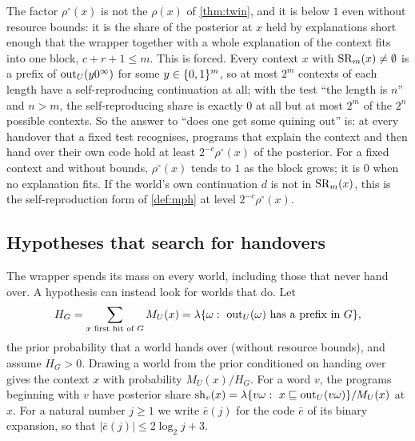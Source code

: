 The factor $\rho^\circ(x)$ is not the $\rho(x)$ of \cref{thm:twin}, and it is below $1$ even without resource
bounds: it is the share of the posterior at $x$ held by explanations short enough that the wrapper together
with a whole explanation of the context fits into one block, $c+r+1\le m$. This is forced. Every context $x$
with $\mathrm{SR}_m(x)\neq\emptyset$ is a prefix of $\mathrm{out}_U(y0^\infty)$ for some $y\in\{0,1\}^m$, so at most $2^m$ contexts
of each length have a self-reproducing continuation at all; with the test ``the length is $n$'' and $n>m$, the
self-reproducing share is exactly $0$ at all but at most $2^m$ of the $2^n$ possible contexts. So the answer to
``does one get some quining out'' is: at every handover that a fixed test recognises, programs that explain
the context and then hand over their own code hold at least $2^{-c}\rho^\circ(x)$ of the posterior. For a fixed
context and without bounds, $\rho^\circ(x)$ tends to $1$ as the block grows; it is $0$ when no explanation
fits. If the world's own continuation $d$ is not in $\mathrm{SR}_m(x)$, this is the self-reproduction form of
\cref{def:mph} at level $2^{-c}\rho^\circ(x)$.

\subsection{Hypotheses that search for handovers}\label{sec:search}

The wrapper spends its mass on every world, including those that never hand over. A hypothesis can instead
look for worlds that do. Let
\[
H_G=\sum_{x\text{ first hit of }G}M_U(x)=\lambda\{\omega:\ \mathrm{out}_U(\omega)\text{ has a prefix in }G\},
\]
the prior probability that a world hands over (without resource bounds), and assume $H_G>0$. Drawing a world
from the prior conditioned on handing over gives the context $x$ with probability $M_U(x)/H_G$. For a word
$v$, the programs beginning with $v$ have posterior share
$\mathrm{sh}_v(x)=\lambda\{v\omega:\ x\pre\out_U(v\omega)\}/M_U(x)$ at $x$. For a natural number $j\ge1$ we
write $\bar e(j)$ for the code $\bar e$ of its binary expansion, so that $|\bar e(j)|\le2\log_2j+3$.

